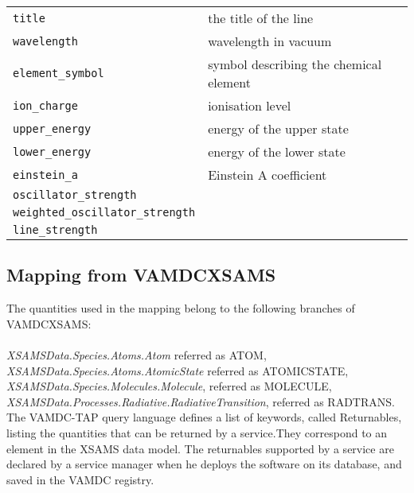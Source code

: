 \documentclass[11pt,a4paper]{ivoa}
\begin{document}
\begin{table}[H]
\begin{center}
\begin{tabular}{l l}%
\texttt{title} & the title of the line \\
\texttt{wavelength} & wavelength in vacuum \\
\texttt{element\_symbol} & symbol describing the chemical element \\
\texttt{ion\_charge} & ionisation level\\
\texttt{upper\_energy} & energy of the upper state \\
\texttt{lower\_energy} & energy of the lower state\\
\texttt{einstein\_a} & Einstein A coefficient\\
\texttt{oscillator\_strength} & \\
\texttt{weighted\_oscillator\_strength} & \\
\texttt{line\_strength} &

\end{tabular}

\end{center}
\end{table}

\subsection{Mapping from VAMDCXSAMS}

The quantities used in the mapping belong to the following branches of VAMDCXSAMS:\\\\
\textit{XSAMSData.Species.Atoms.Atom}  referred as ATOM,\\
\textit{XSAMSData.Species.Atoms.AtomicState}  referred as ATOMICSTATE,\\
\textit{XSAMSData.Species.Molecules.Molecule}, referred as MOLECULE,\\
\textit{XSAMSData.Processes.Radiative.RadiativeTransition}, referred as RADTRANS.\\

The VAMDC-TAP query language defines a list of keywords, called Returnables\cite{XSAMS:returnables}, listing the quantities that can be returned by a service.They correspond to an element in the XSAMS data model. The returnables supported by a service are declared by a service manager when he deploys the software on its database, and saved in the VAMDC registry. \\
\end{document}

